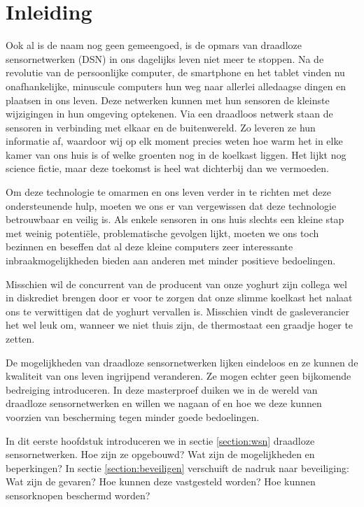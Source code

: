 
\chapter{Inleiding}
\label{inleiding}

Ook al is de naam nog geen gemeengoed, is de opmars van draadloze
sensornetwerken (DSN) in ons dagelijks leven niet meer te stoppen. Na de
revolutie van de persoonlijke computer, de smartphone en het tablet vinden nu
onafhankelijke, minuscule computers hun weg naar allerlei alledaagse dingen en
plaatsen in ons leven. Deze netwerken kunnen met hun sensoren de kleinste
wijzigingen in hun omgeving optekenen. Via een draadloos netwerk staan de
sensoren in verbinding met elkaar en de buitenwereld. Zo leveren ze hun
informatie af, waardoor wij op elk moment precies weten hoe warm het in elke
kamer van ons huis is of welke groenten nog in de koelkast liggen. Het lijkt
nog science fictie, maar deze toekomst is heel wat dichterbij dan we vermoeden.

Om deze technologie te omarmen en ons leven verder in te richten met deze
ondersteunende hulp, moeten we ons er van vergewissen dat deze technologie
betrouwbaar en veilig is. Als enkele sensoren in ons huis slechts een kleine
stap met weinig potenti\"ele, problematische gevolgen lijkt, moeten we ons toch
bezinnen en beseffen dat al deze kleine computers zeer interessante
inbraakmogelijkheden bieden aan anderen met minder positieve bedoelingen.

Misschien wil de concurrent van de producent van onze yoghurt zijn collega wel
in diskrediet brengen door er voor te zorgen dat onze slimme koelkast het
nalaat ons te verwittigen dat de yoghurt vervallen is. Misschien vindt de
gasleverancier het wel leuk om, wanneer we niet thuis zijn, de thermostaat een
graadje hoger te zetten.

De mogelijkheden van draadloze sensornetwerken lijken eindeloos en ze kunnen de
kwaliteit van ons leven ingrijpend veranderen. Ze mogen echter geen bijkomende
bedreiging introduceren. In deze masterproef duiken we in de wereld van
draadloze sensornetwerken en willen we nagaan of en hoe we deze kunnen voorzien
van bescherming tegen minder goede bedoelingen.

In dit eerste hoofdstuk introduceren we in sectie \ref{section:wsn} draadloze
sensornetwerken. Hoe zijn ze opgebouwd? Wat zijn de mogelijkheden en
beperkingen? In sectie \ref{section:beveiligen} verschuift de nadruk naar
beveiliging: Wat zijn de gevaren? Hoe kunnen deze vastgesteld worden? Hoe
kunnen sensorknopen beschermd worden?

